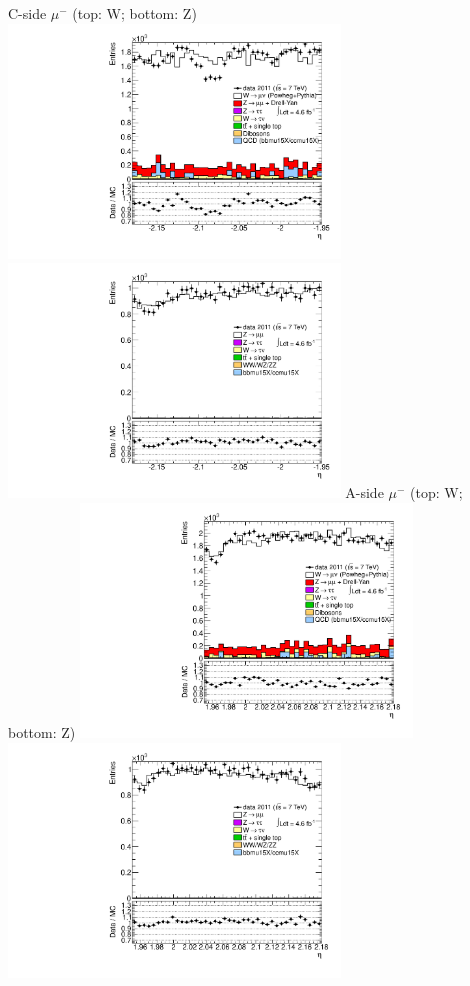  {
\colb[T]
C-side $\mu^{-}$ (top: W; bottom: Z)
\centering
\includegraphics[width=0.66\textwidth]{dates/20130306/figures/both/WlQ3_10_C_stack_l_eta_NEG} \\
\includegraphics[width=0.66\textwidth]{dates/20130306/figures/both/Z_10_C_stack_lN_eta_ALL.pdf}
A-side $\mu^{-}$ (top: W; bottom: Z)
\centering
\includegraphics[width=0.66\textwidth]{dates/20130306/figures/both/WlQ3_10_A_stack_l_eta_NEG} \\
\includegraphics[width=0.66\textwidth]{dates/20130306/figures/both/Z_10_A_stack_lN_eta_ALL.pdf} 
\cole
} %
